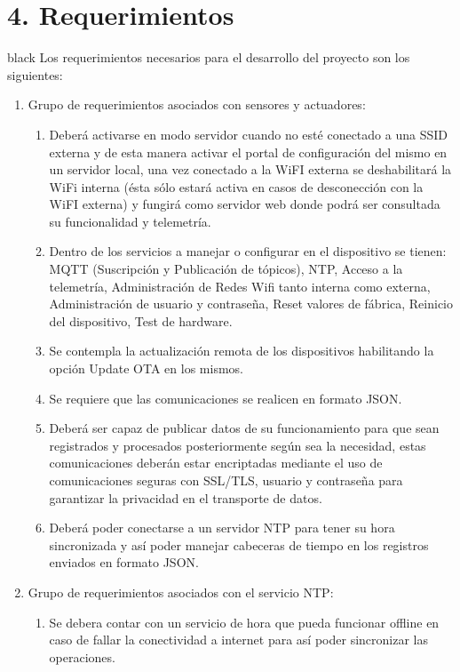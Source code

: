 \documentclass[11pt]{charter}
\begin{document}

\section{4. Requerimientos}
\label{sec:requerimientos}
\begin{consigna}{black}
Los requerimientos necesarios para el desarrollo del proyecto son los siguientes:
\begin{enumerate}
\item Grupo de requerimientos asociados con sensores y actuadores:
	\begin{enumerate}
		\item Deberá activarse en modo servidor cuando no esté conectado a una SSID externa y de esta manera activar el portal de configuración del mismo en un servidor local, una vez conectado a la WiFI externa se deshabilitará la WiFi interna (ésta sólo estará activa en casos de desconección con la WiFI externa) y fungirá como servidor web donde podrá ser consultada su funcionalidad y telemetría.
		\item Dentro de los servicios a manejar o configurar en el dispositivo se tienen: MQTT (Suscripción y Publicación de tópicos), NTP, Acceso a la telemetría, Administración de Redes Wifi tanto interna como externa, Administración de usuario y contraseña, Reset valores de fábrica, Reinicio del dispositivo, Test de hardware.
		\item Se contempla la actualización remota de los dispositivos habilitando la opción Update OTA en los mismos.
		\item Se requiere que las comunicaciones se realicen en formato JSON.
		\item Deberá ser capaz de publicar datos de su funcionamiento para que sean registrados y procesados posteriormente según sea la necesidad, estas comunicaciones deberán estar encriptadas mediante el uso de comunicaciones seguras con SSL/TLS, usuario y contraseña para garantizar la privacidad en el transporte de datos.
		\item Deberá poder conectarse a un servidor NTP para tener su hora sincronizada y así poder manejar cabeceras de tiempo en los registros enviados en formato JSON.
	\end{enumerate}
\item Grupo de requerimientos asociados con el servicio NTP:
	\begin{enumerate}
		\item Se debera contar con un servicio de hora que pueda funcionar offline en caso de fallar la conectividad a internet para así poder sincronizar las operaciones.

\end{enumerate}
\end{enumerate}
\end{consigna}
\end{document}
